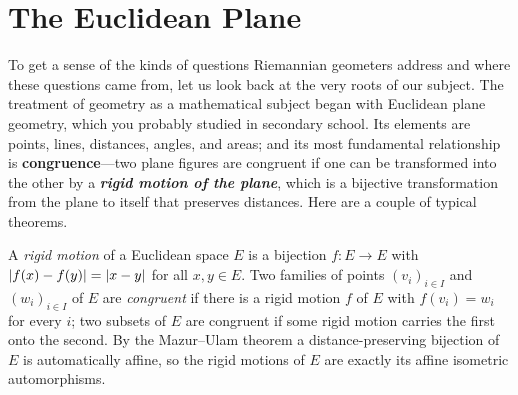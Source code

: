 \section{The Euclidean Plane}

To get a sense of the kinds of questions Riemannian geometers address and where these questions came from, let us look back at the very roots of our subject. The treatment of geometry as a mathematical subject began with Euclidean plane geometry, which you probably studied in secondary school. Its elements are points, lines, distances, angles, and areas; and its most fundamental relationship is \textbf{congruence}---two plane figures are congruent if one can be transformed into the other by a \textbf{\textit{rigid motion of the plane}}, which is a bijective transformation from the plane to itself that preserves distances. Here are a couple of typical theorems.

\begin{definition}
\label{def:rigid-motion}
\mathlibok
A \emph{rigid motion} of a Euclidean space $E$ is a bijection $f\colon E\to E$ with
$\lvert f(x)-f(y) \rvert = \lvert x-y \rvert$ for all $x,y\in E$. Two families of points $(v_i)_{i\in I}$ and
$(w_i)_{i\in I}$ of $E$ are \emph{congruent} if there is a rigid motion $f$ of $E$ with $f(v_i)=w_i$
for every $i$; two subsets of $E$ are congruent if some rigid motion carries the first onto the
second. By the Mazur--Ulam theorem a distance-preserving bijection of $E$ is automatically affine, so
the rigid motions of $E$ are exactly its affine isometric automorphisms.
\end{definition}

